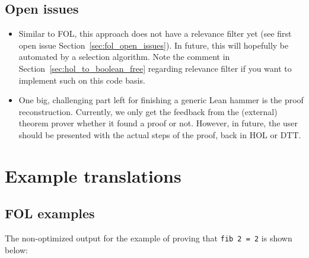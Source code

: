 \documentclass[a4paper]{article}
\begin{document}
\subsection{Open issues}
\begin{itemize}
	\item Similar to FOL, this approach does not have a relevance filter yet (see first open issue Section~\ref{sec:fol_open_issues}). In future, this will hopefully be automated by a selection algorithm. Note the comment in Section~\ref{sec:hol_to_boolean_free} regarding relevance filter if you want to implement such on this code basis.
	\item One big, challenging part left for finishing a generic Lean hammer is the proof reconstruction. Currently, we only get the feedback from the (external) theorem prover whether it found a proof or not. However, in future, the user should be presented with the actual steps of the proof, back in HOL or DTT.
\end{itemize}

\newpage



\appendix
\section{Example translations}
\subsection{FOL examples}
\label{sec:fol_examples}
The non-optimized output for the example of proving that \texttt{fib 2 = 2} is shown below:
\end{document}
